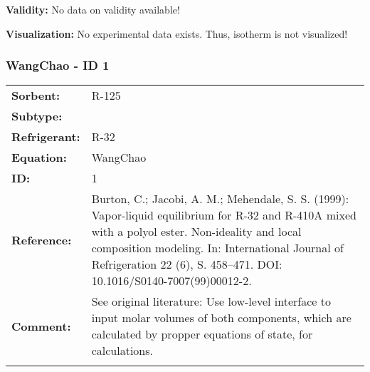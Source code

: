 \textbf{Validity:}
\newline
No data on validity available!
\newline

\textbf{Visualization:}
%
\newline
No experimental data exists. Thus, isotherm is not visualized!
%

\FloatBarrier
\newpage
\subsubsection{WangChao - ID 1}
%
\begin{tabular}[l]{|lp{11.5cm}|}
\hline
\addlinespace

\textbf{Sorbent:} & R-125 \\
\textbf{Subtype:} &  \\
\textbf{Refrigerant:} & R-32 \\
\textbf{Equation:} & WangChao \\
\textbf{ID:} & 1 \\
\textbf{Reference:} & Burton, C.; Jacobi, A. M.; Mehendale, S. S. (1999): Vapor-liquid equilibrium for R-32 and R-410A mixed with a polyol ester. Non-ideality and local composition modeling. In: International Journal of Refrigeration 22 (6), S. 458–471. DOI: 10.1016/S0140-7007(99)00012-2. \\
\textbf{Comment:} & See original literature: Use low-level interface to input molar volumes of both components, which are calculated by propper equations of state, for calculations. \\

\addlinespace
\hline
\end{tabular}
\newline

